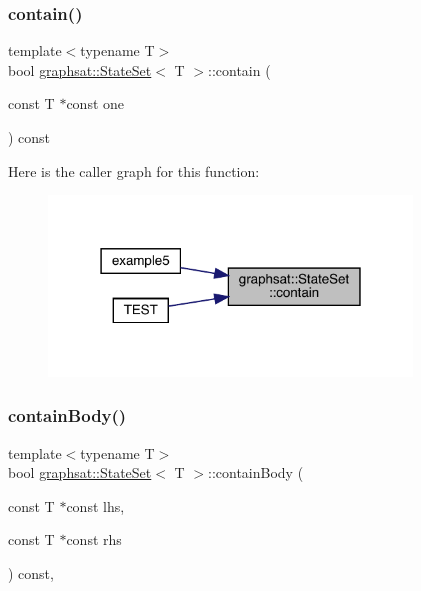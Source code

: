 \subsubsection{\texorpdfstring{contain()}{contain()}}
{\footnotesize\ttfamily template$<$typename T$>$ \\
bool \mbox{\hyperlink{classgraphsat_1_1_state_set}{graphsat\+::\+State\+Set}}$<$ T $>$\+::contain (\begin{DoxyParamCaption}\item[{const T $\ast$const}]{one }\end{DoxyParamCaption}) const\hspace{0.3cm}{\ttfamily [inline]}}

Here is the caller graph for this function\+:
\nopagebreak
\begin{figure}[H]
\begin{center}
\leavevmode
\includegraphics[width=274pt]{classgraphsat_1_1_state_set_a8302bab8034c6f16cf9adbbd84b3a535_icgraph}
\end{center}
\end{figure}
\mbox{\label{classgraphsat_1_1_state_set_ac83a9a8a89c6976ba650fc6b221c4cf0}} 
\subsubsection{\texorpdfstring{containBody()}{containBody()}}
{\footnotesize\ttfamily template$<$typename T$>$ \\
bool \mbox{\hyperlink{classgraphsat_1_1_state_set}{graphsat\+::\+State\+Set}}$<$ T $>$\+::contain\+Body (\begin{DoxyParamCaption}\item[{const T $\ast$const}]{lhs,  }\item[{const T $\ast$const}]{rhs }\end{DoxyParamCaption}) const\hspace{0.3cm}{\ttfamily [inline]}, {\ttfamily [private]}}

